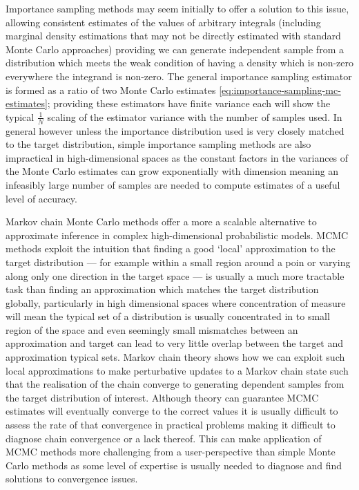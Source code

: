 Importance sampling methods may seem initially to offer a solution to this issue, allowing consistent estimates of the values of arbitrary integrals (including marginal density estimations that may not be directly estimated with standard Monte Carlo approaches) providing we can generate independent sample from a distribution which meets the weak condition of having a density which is non-zero everywhere the integrand is non-zero. The general importance sampling estimator is formed as a ratio of two Monte Carlo estimates \eqref{eq:importance-sampling-mc-estimates}; providing these estimators have finite variance each will show the typical $\frac{1}{N}$ scaling of the estimator variance with the number of samples used. In general however unless the importance distribution used is very closely matched to the target distribution, simple importance sampling methods are also impractical in high-dimensional spaces as the constant factors in the variances of the Monte Carlo estimates can grow exponentially with dimension meaning an infeasibly large number of samples are needed to compute estimates of a useful level of accuracy.

Markov chain Monte Carlo methods offer a more a scalable alternative to approximate inference in complex high-dimensional probabilistic models. \ac{MCMC} methods exploit the intuition that finding a good `local' approximation to the target distribution --- for example within a small region around a poin or varying along only one direction in the target space --- is usually a much more tractable task than finding an approximation which matches the target distribution globally, particularly in high dimensional spaces where concentration of measure will mean the typical set of a distribution is usually concentrated in to small region of the space and even seemingly small mismatches between an approximation and target can lead to very little overlap between the target and approximation typical sets. Markov chain theory shows how we can exploit such local approximations to make perturbative updates to a Markov chain state such that the realisation of the chain converge to generating dependent samples from the target distribution of interest. Although theory can guarantee \ac{MCMC} estimates will eventually converge to the correct values it is usually difficult to assess the rate of that convergence in practical problems making it difficult to diagnose chain convergence or a lack thereof. This can make application of \ac{MCMC} methods more challenging from a user-perspective than simple Monte Carlo methods as some level of expertise is usually needed to diagnose and find solutions to convergence issues.


